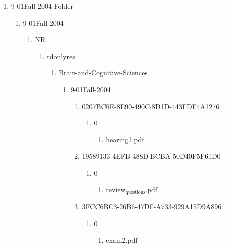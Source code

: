 \documentclass[11pt]{article}
\begin{document}
\begin{enumerate}
\begin{enumerate}
\begin{enumerate}
\begin{enumerate}
\begin{enumerate}
\item 9-01Fall-2004 Folder
\label{sec-1-1-1-1-7-3-24-12}
\begin{enumerate}
\item 9-01Fall-2004
\label{sec-1-1-1-1-7-3-24-12-1}
\begin{enumerate}
\item NR
\label{sec-1-1-1-1-7-3-24-12-1-1}
\begin{enumerate}
\item rdonlyres
\label{sec-1-1-1-1-7-3-24-12-1-1-1}
\begin{enumerate}
\item Brain-and-Cognitive-Sciences
\label{sec-1-1-1-1-7-3-24-12-1-1-1-1}
\begin{enumerate}
\item 9-01Fall-2004
\label{sec-1-1-1-1-7-3-24-12-1-1-1-1-1}
\begin{enumerate}
\item 0207BC6E-8E90-490C-8D1D-443FDF4A1276
\label{sec-1-1-1-1-7-3-24-12-1-1-1-1-1-1}
\begin{enumerate}
\item 0
\label{sec-1-1-1-1-7-3-24-12-1-1-1-1-1-1-1}
\begin{enumerate}
\item hearing1.pdf
\label{sec-1-1-1-1-7-3-24-12-1-1-1-1-1-1-1-1}
\end{enumerate}
\end{enumerate}

\item 19589133-4EFB-488D-BCBA-50D40F5F61D0
\label{sec-1-1-1-1-7-3-24-12-1-1-1-1-1-2}
\begin{enumerate}
\item 0
\label{sec-1-1-1-1-7-3-24-12-1-1-1-1-1-2-1}
\begin{enumerate}
\item review$_{\text{questions}}$.pdf
\label{sec-1-1-1-1-7-3-24-12-1-1-1-1-1-2-1-1}
\end{enumerate}
\end{enumerate}

\item 3FCC6BC3-26B6-47DF-A733-929A15D9A896
\label{sec-1-1-1-1-7-3-24-12-1-1-1-1-1-3}
\begin{enumerate}
\item 0
\label{sec-1-1-1-1-7-3-24-12-1-1-1-1-1-3-1}
\begin{enumerate}
\item exam2.pdf
\label{sec-1-1-1-1-7-3-24-12-1-1-1-1-1-3-1-1}
\end{enumerate}
\end{enumerate}


\end{enumerate}
\end{enumerate}
\end{enumerate}
\end{enumerate}
\end{enumerate}
\end{enumerate}
\end{enumerate}
\end{enumerate}
\end{enumerate}
\end{enumerate}
\end{enumerate}
\end{document}

